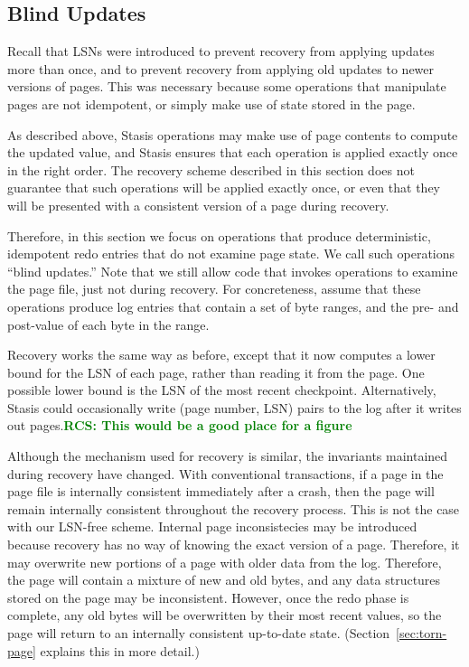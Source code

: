 \documentclass[letterpaper,twocolumn,10pt]{article}
\newcommand{\yad}{Stasis\xspace}
\newcommand{\rcs}[1]{\textcolor{green}{\bf RCS: #1}}
\begin{document}
\subsection{Blind Updates}

Recall that LSNs were introduced to prevent recovery from applying
updates more than once, and to prevent recovery from applying old
updates to newer versions of pages.  This was necessary because some
operations that manipulate pages are not idempotent, or simply make
use of state stored in the page.  

As described above, \yad operations may make use of page contents to
compute the updated value, and \yad ensures that each operation is
applied exactly once in the right order. The recovery scheme described
in this section does not guarantee that such operations will be
applied exactly once, or even that they will be presented with a
consistent version of a page during recovery.

Therefore, in this section we focus on operations that produce
deterministic, idempotent redo entries that do not examine page state.
We call such operations ``blind updates.''  Note that we still allow
code that invokes operations to examine the page file, just not during
recovery.  For concreteness, assume that these operations produce log
entries that contain a set of byte ranges, and the pre- and post-value
of each byte in the range.

Recovery works the same way as before, except that it now computes
a lower bound for the LSN of each page, rather than reading it from the page.
One possible lower bound is the LSN of the most recent checkpoint.  Alternatively, \yad could occasionally write (page number, LSN) pairs to the log after it writes out pages.\rcs{This would be a good place for a figure}

Although the mechanism used for recovery is similar, the invariants
maintained during recovery have changed.  With conventional
transactions, if a page in the page file is internally consistent
immediately after a crash, then the page will remain internally
consistent throughout the recovery process.  This is not the case with
our LSN-free scheme.  Internal page inconsistecies may be introduced
because recovery has no way of knowing the exact version of a page.
Therefore, it may overwrite new portions of a page with older data
from the log.  Therefore, the page will contain a mixture of new and
old bytes, and any data structures stored on the page may be
inconsistent.  However, once the redo phase is complete, any old bytes
will be overwritten by their most recent values, so the page will
return to an internally consistent up-to-date state.
(Section~\ref{sec:torn-page} explains this in more detail.)
\end{document}
